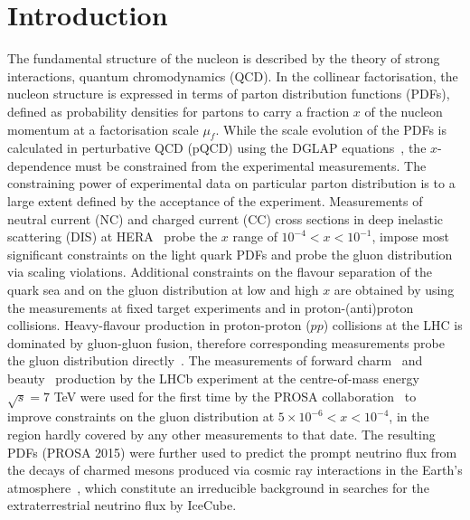 \section{Introduction}
\label{sect:intro}

The fundamental structure of the nucleon is described by the theory of strong interactions, quantum chromodynamics (QCD).
In the collinear factorisation, the nucleon structure is expressed in terms of parton distribution functions (PDFs), defined 
as probability densities for partons to carry a fraction $x$ of the nucleon momentum at a factorisation scale $\mu_f$. While the 
scale evolution of the PDFs is calculated in perturbative QCD (pQCD) using the DGLAP equations~\cite{Dokshitzer:1977sg,Gribov:1972ri,Altarelli:1977zs,Curci:1980uw,Furmanski:1980cm,Moch:2004pa,Vogt:2004mw}, the 
$x$-dependence must be constrained from the experimental measurements. The constraining power of experimental data 
on particular parton distribution is to a large extent defined by the acceptance of the experiment. Measurements of 
neutral current (NC) and charged current (CC) cross sections in deep inelastic scattering (DIS) at HERA~\cite{Abramowicz:2015mha} probe the $x$ range of $10^{-4}<x<10^{-1}$, impose most significant constraints on the light quark PDFs and probe the gluon distribution via scaling violations. Additional constraints on the flavour separation of the quark sea and on the gluon distribution at low and high $x$ are obtained by using the measurements at fixed target experiments and in proton-(anti)proton collisions. 
Heavy-flavour production in proton-proton ($pp$) collisions at the LHC is dominated by gluon-gluon fusion, therefore corresponding measurements probe the gluon distribution directly~\cite{Zenaiev:2015rfa,Gauld:2015yia,Gauld:2016kpd,Bertone:2018dse}. 
The measurements of forward charm~\cite{Aaij:2013mga} and beauty~\cite{Aaij:2013noa} production by the LHCb experiment at the centre-of-mass energy $\sqrt{s}=7$ TeV were used for the first time by the PROSA collaboration~\cite{Zenaiev:2015rfa} to improve constraints on the gluon distribution at $5 \times 10^{-6}< x < 10^{-4}$, in the region hardly covered by any other measurements to that date. 
The resulting PDFs (PROSA 2015) were further used to predict the prompt neutrino flux from the decays of charmed mesons produced via cosmic ray interactions in the Earth's atmosphere~\cite{Garzelli:2016xmx}, which constitute an irreducible background in searches for the extraterrestrial neutrino flux by IceCube. 
